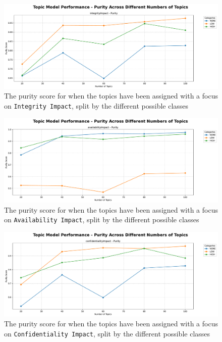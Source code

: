 \documentclass[12pt]{article}
\begin{document}
\begin{figure}[ht] \centering
	\includegraphics[width=1\textwidth]{figures/purity/topic_model_performance_purity_ground_truth_integrityImpact.pdf}
	\caption{\label{fig:purity_integrity}The purity score
		for when the topics have been assigned with a focus on \texttt{Integrity Impact}, split by the different
		possible classes}
\end{figure}

\begin{figure}[ht] \centering
	\includegraphics[width=1\textwidth]{figures/purity/topic_model_performance_purity_ground_truth_availabilityImpact.pdf}
	\caption{\label{fig:purity_20_availability}The purity score
		for when the topics have been assigned with a focus on \texttt{Availability Impact}, split by the different
		possible classes}
\end{figure}

\begin{figure}[ht] \centering
	\includegraphics[width=1\textwidth]{figures/purity/topic_model_performance_purity_ground_truth_confidentialityImpact.pdf}
	\caption{\label{fig:purity_20_confidentiality}The purity score
		for when the topics have been assigned with a focus on \texttt{Confidentiality Impact}, split by the different
		possible classes}
\end{figure}
\end{document}
